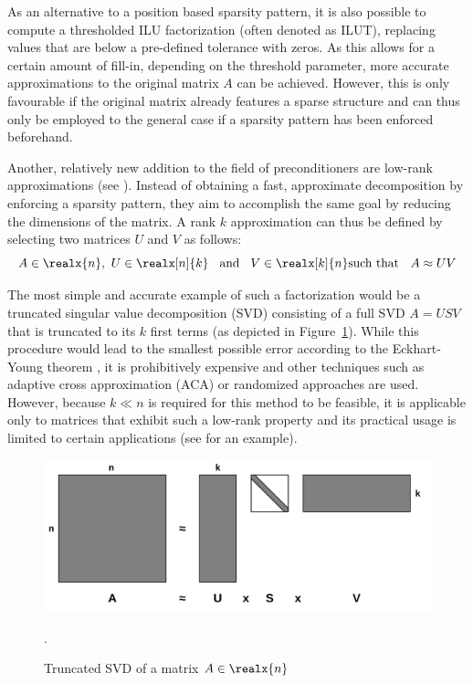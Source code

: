 As an alternative to a position based sparsity pattern, it is also possible to compute a thresholded ILU factorization (often denoted as ILUT), replacing values that are below a pre-defined tolerance with zeros. As this allows for a certain amount of fill-in, depending on the threshold parameter, more accurate approximations to the original matrix $A$ can be achieved. However, this is only favourable if the original matrix already features a sparse structure and can thus only be employed to the general case if a sparsity pattern has been enforced beforehand.

Another, relatively new addition to the field of preconditioners are low-rank approximations (see \cite{markovsky_low_2011}). Instead of obtaining a fast, approximate decomposition by enforcing a sparsity pattern, they aim to accomplish the same goal by reducing the dimensions of the matrix. A rank $k$ approximation can thus be defined by selecting two matrices $U$ and $V$ as follows:
\begin{equation}
    A \in \realx{n}\text{,}\:\; U \in \realx[n]{k}\;\; \text{ and }\;\; V \in \realx[k]{n}
    \text{such that }\;\ A \approx UV
\end{equation}

\noindent The most simple and accurate example of such a factorization would be a truncated singular value decomposition (SVD) consisting of a full SVD $A=USV$ that is truncated to its $k$ first terms (as depicted in Figure~\hyperref[fig:svd]{\ref{fig:svd}}). While this procedure would lead to the smallest possible error according to the Eckhart-Young theorem \cite{eckart_approximation_1936}, it is prohibitively expensive and other techniques such as adaptive cross approximation (ACA) \cite{rjasanow_adaptive_2000} or randomized approaches \cite{martinsson_randomized_2019} are used. However, because $k \ll n$ is required for this method to be feasible, it is applicable only to matrices that exhibit such a low-rank property and its practical usage is limited to certain applications (see \cite{higham_new_2019} for an example).

\begin{figure}[h]
    \centering
    \includegraphics[width=0.7\linewidth]{figures/SVD.pdf}
    \caption{Truncated SVD of a matrix $A \in \realx{n}$}.
    \label{fig:svd}
\end{figure}

